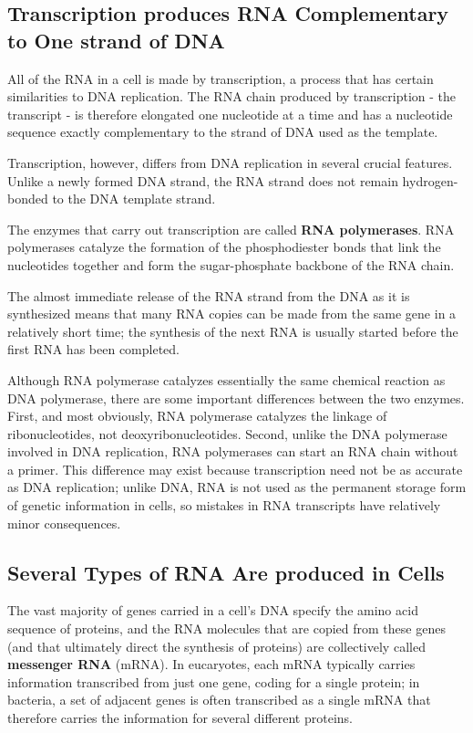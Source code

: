 \subsection{Transcription produces RNA Complementary to One strand of DNA}

All of the RNA in a cell is made by transcription, a process that has certain
similarities to DNA replication.
The RNA chain produced by transcription - the transcript - is therefore
elongated one nucleotide at a time and has a nucleotide sequence exactly
complementary to the strand of DNA used as the template.

Transcription, however, differs from DNA replication in several crucial
features. Unlike a newly formed DNA strand, the RNA strand does not
remain hydrogen-bonded to the DNA template strand.

The enzymes that carry out transcription are called \textbf{RNA polymerases}.
RNA polymerases catalyze the formation of the phosphodiester bonds that
link the nucleotides together and form the sugar-phosphate
backbone of the RNA chain.

The almost immediate release of the RNA strand from the DNA as it is
synthesized means that many RNA copies can be made from the same
gene in a relatively short time; the synthesis of the next RNA is usually
started before the first RNA has been completed.

Although RNA polymerase catalyzes essentially the same chemical reaction
as DNA polymerase, there are some important differences between
the two enzymes. First, and most obviously, RNA polymerase catalyzes
the linkage of ribonucleotides, not deoxyribonucleotides. Second, unlike
the DNA polymerase involved in DNA replication, RNA polymerases can
start an RNA chain without a primer. This difference may exist because
transcription need not be as accurate as DNA replication; unlike DNA,
RNA is not used as the permanent storage form of genetic information in
cells, so mistakes in RNA transcripts have relatively minor consequences.

\subsection{Several Types of RNA Are produced in Cells}

The vast majority of genes carried in a cell’s DNA specify the amino
acid sequence of proteins, and the RNA molecules that are copied from
these genes (and that ultimately direct the synthesis of proteins) are collectively
called \textbf{messenger RNA} (mRNA). In eucaryotes, each mRNA
typically carries information transcribed from just one gene, coding for a
single protein; in bacteria, a set of adjacent genes is often transcribed as
a single mRNA that therefore carries the information for several different
proteins.


